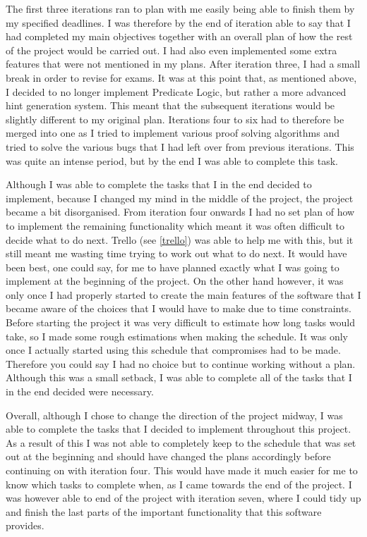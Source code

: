 The first three iterations ran to plan with me easily being able to finish them by my specified deadlines. I was therefore by the end of iteration able to say that I had completed my main objectives together with an overall plan of how the rest of the project would be carried out. I had also even implemented some extra features that were not mentioned in my plans. After iteration three, I had a small break in order to revise for exams. It was at this point that, as mentioned above, I decided to no longer implement Predicate Logic, but rather a more advanced hint generation system. This meant that the subsequent iterations would be slightly different to my original plan. Iterations four to six had to therefore be merged into one as I tried to implement various proof solving algorithms and tried to solve the various bugs that I had left over from previous iterations. This was quite an intense period, but by the end I was able to complete this task. 

Although I was able to complete the tasks that I in the end decided to implement, because I changed my mind in the middle of the project, the project became a bit disorganised. From iteration four onwards I had no set plan of how to implement the remaining functionality which meant it was often difficult to decide what to do next. Trello (see \ref{trello}) was able to help me with this, but it still meant me wasting time trying to work out what to do next. It would have been best, one could say, for me to have planned exactly what I was going to implement at the beginning of the project. On the other hand however, it was only once I had properly started to create the main features of the software that I became aware of the choices that I would have to make due to time constraints. Before starting the project it was very difficult to estimate how long tasks would take, so I made some rough estimations when making the schedule. It was only once I actually started using this schedule that compromises had to be made. Therefore you could say I had no choice but to continue working without a plan. Although this was a small setback, I was able to complete all of the tasks that I in the end decided were necessary.

Overall, although I chose to change the direction of the project midway, I was able to complete the tasks that I decided to implement throughout this project. As a result of this I was not able to completely keep to the schedule that was set out at the beginning and should have changed the plans accordingly before continuing on with iteration four. This would have made it much easier for me to know which tasks to complete when, as I came towards the end of the project. I was however able to end of the project with iteration seven, where I could tidy up and finish the last parts of the important functionality that this software provides.


